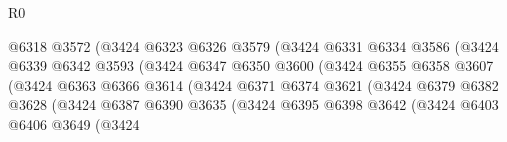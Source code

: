 \begin{lexlean}{R0}
\begin{coremodule}
                                      @6318
                                      @3572
                                      (@3424
                                        @6323
                                        @6326
                                        @3579
                                        (@3424
                                          @6331
                                          @6334
                                          @3586
                                          (@3424
                                            @6339
                                            @6342
                                            @3593
                                            (@3424
                                              @6347
                                              @6350
                                              @3600
                                              (@3424
                                                @6355
                                                @6358
                                                @3607
                                                (@3424
                                                  @6363
                                                  @6366
                                                  @3614
                                                  (@3424
                                                    @6371
                                                    @6374
                                                    @3621
                                                    (@3424
                                                      @6379
                                                      @6382
                                                      @3628
                                                      (@3424
                                                        @6387
                                                        @6390
                                                        @3635
                                                        (@3424
                                                          @6395
                                                          @6398
                                                          @3642
                                                          (@3424
                                                            @6403
                                                            @6406
                                                            @3649
                                                            (@3424

\end{coremodule}
\end{lexlean}
